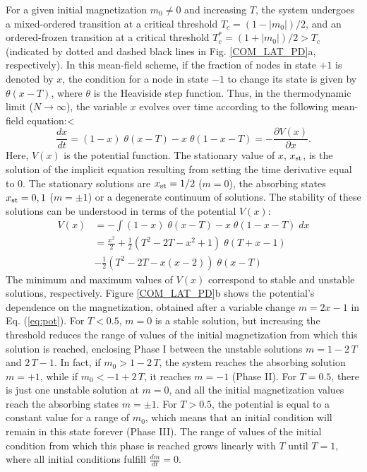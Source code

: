 	For a given initial magnetization $m_0 \neq 0$ and increasing $T$, the system undergoes a mixed-ordered transition at a critical threshold $T_{c} = (1-|m_0|)/2$, and an ordered-frozen transition at a critical threshold $T_{c}^{*} = (1 + |m_0|)/2 > T_{c}$ (indicated by dotted and dashed black lines in Fig. \ref{COM_LAT_PD}a, respectively). In this mean-field scheme, if the fraction of nodes in state $+1$ is denoted by $x$, the condition for a node in state $-1$ to change its state is given by $\theta(x - T)$, where  $\theta$ is the Heaviside step function. Thus, in the thermodynamic limit ($N\to \infty$), the variable $x$ evolves over time according to the following mean-field equation:<
	\begin{equation}
		\frac{dx}{dt} = (1 - x) \; \theta(x - T) - x \; \theta(1 - x - T) = - \frac{\partial V(x)}{\partial x}.
	\end{equation}
	Here, $V(x)$ is the potential function. The stationary value of $x$, $x_{\rm st}$, is the solution of the implicit equation resulting from setting the time derivative equal to $0$. The stationary solutions are $x_{\rm st} = 1/2$ ($m =0$), the absorbing states $x_{\rm st} = 0,1$ ($m = \pm 1$) or a degenerate continuum of solutions. The stability of these solutions can be understood in terms of the potential $V(x)$:
	\begin{eqnarray}
		\label{eq:pot}
		V(x) &=-\int (1 - x) \; \theta(x - T) - x \; \theta(1 - x - T) \; dx \nonumber\\
		&=\frac{x^2}{2} + \frac{1}{2} \left( T^2 - 2T - x^2 + 1\right) \; \theta(T+x-1)\\
		&- \frac{1}{2} \left( T^2 - 2T - x(x-2)\right) \; \theta(x - T)\nonumber
	\end{eqnarray}
	The minimum and maximum values of $V(x)$ correspond to stable and unstable solutions, respectively. Figure \ref{COM_LAT_PD}b shows the potential's dependence on the magnetization, obtained after a variable change $m = 2x-1$ in Eq. (\ref{eq:pot}). For $T < 0.5$, $m = 0$ is a stable solution, but increasing the threshold reduces the range of values of the initial magnetization from which this solution is reached, enclosing Phase I between the unstable solutions $m = 1-2\, T$ and $2\, T-1$. In fact, if $m_0 > 1-2\, T$, the system reaches the absorbing solution $m=+1$, while if $m_0 < -1+2\, T$, it reaches $m=-1$ (Phase II). For $T = 0.5$, there is just one unstable solution at $m=0$, and all the initial magnetization values reach the absorbing states $m=\pm 1$. For $T > 0.5$, the potential is equal to a constant value for a range of $m_0$, which means that an initial condition will remain in this state forever (Phase III). The range of values of the initial condition from which this phase is reached grows linearly with $T$ until $T=1$, where all initial conditions fulfill $\frac{dm}{dt}=0$.
	
